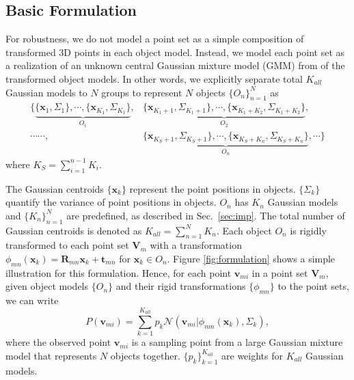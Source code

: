 \subsection{Basic Formulation}
For robustness, we do not model a point set as a simple composition of transformed 3D points in each object model. 
Instead, we model each point set as a realization of an unknown central Gaussian mixture model (GMM) from of the transformed object models. 
In other words, we explicitly separate total $K_{all}$ Gaussian models to $N$ groups to represent $N$ objects $\{O_n\}_{n=1}^N$ as
%
\begin{equation}
\begin{aligned}
\{
\underbrace{ \{\mathbf{x}_{1},\Sigma_{1}\}, \cdots, \{\mathbf{x}_{K_1},\Sigma_{K_1}\}  }_{O_1},&\underbrace{ \{\mathbf{x}_{K_1+1},\Sigma_{K_1+1}\}, \cdots, \{\mathbf{x}_{K_1+K_2},\Sigma_{K_1+K_2}\}  }_{O_2},\\ 
\cdots \cdots,& 
\underbrace{ \{\mathbf{x}_{K_S+1},\Sigma_{K_S+1}\},\cdots,\{\mathbf{x}_{K_S+K_n},\Sigma_{K_S+K_n}\}  }_{O_n},\cdots \}
\end{aligned}
\end{equation}
where $K_S = \sum_{i=1}^{n-1}K_i$.

The Gaussian centroids $\{\mathbf{x}_{k}\}$ represent the point positions in objects. $\{\Sigma_{k}\}$ quantify the variance of point positions in objects. $O_n$ has $K_n$ Gaussian models and $\{K_n\}_{n=1}^N$ are predefined, as described in Sec.~\ref{sec:imp}.
The total number of Gaussian centroids is denoted as $K_{all} = \sum_{n=1}^{N}K_n$.  
%
Each object $O_{n}$ is rigidly transformed to each point set $\mathbf{V}_m$ with a transformation $\phi_{mn}(\mathbf{x}_{k})=\mathbf{R}_{mn}\mathbf{x}_{k}+\mathbf{t}_{mn}$ for $\mathbf{x}_{k} \in O_n$.
%
Figure \ref{fig:formulation} shows a simple illustration for this formulation.
Hence, for each point $\mathbf{v}_{mi}$ in a point set $\mathbf{V}_m$, given object models $\{O_{n}\}$ and their rigid transformations $\{\phi_{mn}\}$ to the point sets, we can write
%
\begin{equation}
\label{equ:model}
P(\mathbf{v}_{mi})=\sum^{K_{all}}_{k=1}p_k\mathcal{N}(\mathbf{v}_{mi}|\phi_{mn}(\mathbf{x}_k),\Sigma_k),
\end{equation}
%
where the observed point $\mathbf{v}_{mi}$ is a sampling point from a large Gaussian mixture model that represents $N$ objects together.
$\{p_k\}_{k=1}^{K_{all}} $ are weights for $K_{all}$ Gaussian models. 



